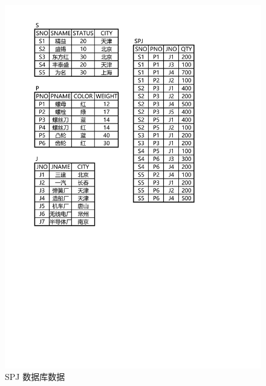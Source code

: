 \documentclass[12pt, oneside]{ctexart}
\numberwithin{figure}{section}
\numberwithin{table}{section}
\begin{document}
\begin{figure}[!htpb]
    \centering
    \includegraphics[width=13cm]{images/sec2/2-2_SPJ.pdf}
    \caption{SPJ 数据库数据}
    \label{SPJ}
\end{figure}
\end{document}
